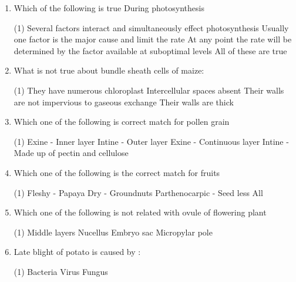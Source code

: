 \documentclass[twocolumn]{article}
\begin{document}
\begin{enumerate}
    \begin{tasks}(2)
        \task OAA
        \task Malic acid
        \task Aspartic acid
    \end{tasks}
    \begin{tasks}(2)
        \task Only a
        \task Only a, b
        \task Only a, c
        \task All of these
    \end{tasks}
    \item Which of the following is true During photosynthesis
    \begin{tasks}(1)
        \task Several factors interact and simultaneously effect photosynthesis
        \task Usually one factor is the major cause and limit the rate
        \task At any point the rate will be determined by the factor available at suboptimal levels
        \task All of these are true
    \end{tasks}
    \item What is not true about bundle sheath cells of maize:
    \begin{tasks}(1)
        \task They have numerous chloroplast
        \task Intercellular spaces absent
        \task Their walls are not impervious to gaseous exchange
        \task Their walls are thick
    \end{tasks}
    \item Which one of the following is correct match for pollen grain
    \begin{tasks}(1)
        \task Exine - Inner layer
        \task Intine - Outer layer
        \task Exine - Continuous layer
        \task Intine - Made up of pectin and cellulose
    \end{tasks}
    \item Which one of the following is the correct match for fruits
    \begin{tasks}(1)
        \task Fleshy - Papaya
        \task Dry - Groundnuts
        \task Parthenocarpic - Seed less
        \task All
    \end{tasks}
    \item Which one of the following is not related with ovule of flowering plant
    \begin{tasks}(1)
        \task Middle layers
        \task Nucellus
        \task Embryo sac
        \task Micropylar pole
    \end{tasks}
    \item Late blight of potato is caused by :
    \begin{tasks}(1)
        \task Bacteria
        \task Virus
        \task Fungus

\end{tasks}
\end{enumerate}
\end{document}
